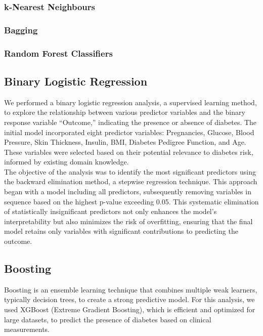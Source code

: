 \documentclass[12pt]{article}
\begin{document}
 \subsubsection{k-Nearest Neighbours}

 \subsubsection{Bagging}

 \subsubsection{Random Forest Classifiers}

\subsection{Binary Logistic Regression}
We performed a binary logistic regression analysis, a supervised learning method, to explore the relationship between various predictor variables and the binary response variable “Outcome,” indicating the presence or absence of diabetes. The initial model incorporated eight predictor variables: Pregnancies, Glucose, Blood Pressure, Skin Thickness, Insulin, BMI, Diabetes Pedigree Function, and Age. These variables were selected based on their potential relevance to diabetes risk, informed by existing domain knowledge.\\
\setlength{\parindent}{0pt}
The objective of the analysis was to identify the most significant predictors using the backward elimination method, a stepwise regression technique. This approach began with a model including all predictors, subsequently removing variables in sequence based on the highest p-value exceeding 0.05. This systematic elimination of statistically insignificant predictors not only enhances the model’s interpretability but also minimizes the risk of overfitting, ensuring that the final model retains only variables with significant contributions to predicting the outcome.

\subsection{Boosting}

Boosting is an ensemble learning technique that combines multiple weak learners, typically decision trees, to create a strong predictive model. For this analysis, we used XGBoost (Extreme Gradient Boosting), which is efficient and optimized for large datasets, to predict the presence of diabetes based on clinical measurements.
\end{document}
